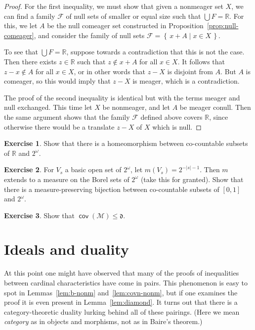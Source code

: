 \documentclass[11pt,oneside]{amsbook}
\newcommand{\set}[1]{\left\{\,#1\,\right\}}
\newcommand{\RR}{\mathbb R}
\newcommand{\Meager}{\mathcal M}
\DeclareMathOperator{\cov}{\mathsf{cov}}
\theoremstyle{definition}
\newtheorem{exerc}{Exercise}[section]
\theoremstyle{plain}
\theoremstyle{definition}
\theoremstyle{remark}
\begin{document}
\begin{proof}
  For the first inequality, we must show that given a nonmeager set $X$, we can find a family $\mathcal F$ of null sets of smaller or equal size such that $\bigcup F=\RR$. For this, we let $A$ be the null comeager set constructed in Proposition~\ref{prop:null-comeager}, and consider the family of null sets $\mathcal F=\set{x+A\mid x\in X}$.

  To see that $\bigcup F=\RR$, suppose towards a contradiction that this is not the case. Then there exists $z\in\RR$ such that $z\notin x+A$ for all $x\in X$. It follows that $z-x\notin A$ for all $x\in X$, or in other words that $z-X$ is disjoint from $A$. But $A$ is comeager, so this would imply that $z-X$ is meager, which is a contradiction.

  The proof of the second inequality is identical but with the terms meager and null exchanged. This time let $X$ be nonmeager, and let $A$ be meager conull. Then the same argument shows that the family $\mathcal F$ defined above covers $\RR$, since otherwise there would be a translate $z-X$ of $X$ which is null.
\end{proof}

\begin{exerc}
  \label{exerc:meager-bij}
  Show that there is a homeomorphism between co-countable subsets of $\RR$ and $2^\omega$.
\end{exerc}

\begin{exerc}
  \label{exerc:null-bij}
  For $V_s$ a basic open set of $2^\omega$, let $m(V_s)=2^{-|s|-1}$. Then $m$ extends to a measure on the Borel sets of $2^\omega$ (take this for granted). Show that there is a measure-preserving bijection between co-countable subsets of $[0,1]$ and $2^\omega$.
\end{exerc}

\begin{exerc}
  \label{exerc:covm-d}
  Show that $\cov(\Meager)\leq\mathfrak d$.
\end{exerc}



\section{Ideals and duality}

At this point one might have observed that many of the proofs of inequalities between cardinal characteristics have come in pairs. This phenomenon is easy to spot in Lemmas~\ref{lem:b-nonm} and~\ref{lem:covn-nonm}, but if one examines the proof it is even present in Lemma~\ref{lem:diamond}. It turns out that there is a category-theoretic duality lurking behind all of these pairings. (Here we mean \emph{category} as in objects and morphisms, not as in Baire's theorem.)
\end{document}
